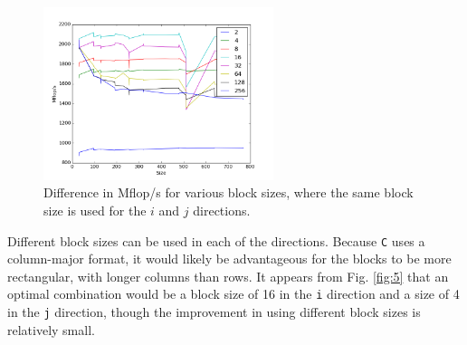 \documentclass[10pt]{article}
\begin{document}
 \begin{figure}[H]
\centering
\includegraphics[width=0.6\textwidth]{figures/256.png}
\caption{Difference in Mflop/s for various block sizes, where the same block size is used for the \(i\) and \(j\) directions.}
\label{fig:4}
\end{figure}

Different block sizes can be used in each of the directions. Because {\tt C} uses a column-major format, it would likely be advantageous for the blocks to be more rectangular, with longer columns than rows. It appears from Fig. \ref{fig:5} that an optimal combination would be a block size of 16 in the {\tt i} direction and a size of 4 in the {\tt j} direction, though the improvement in using different block sizes is relatively small.
\end{document}
